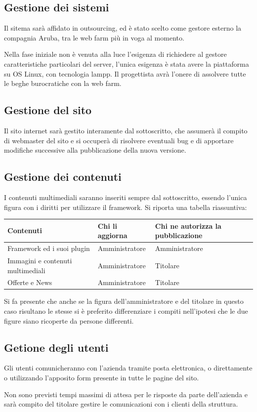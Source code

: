 \documentclass[a4paper,12pt,hidelinks]{report}
\begin{document}
  \subsection{Gestione dei sistemi}
    Il sitema sarà affidato in outsourcing, ed è stato scelto come gestore esterno la compagnia Aruba, tra le web farm più in voga al momento.
    \par Nella fase iniziale non è venuta alla luce l'esigenza di richiedere al gestore caratteristiche particolari del server, l'unica esigenza è stata avere la piattaforma su OS Linux, con tecnologia lampp.
    Il progettista avrà l'onere di assolvere tutte le beghe burocratiche con la web farm.
    
  \subsection{Gestione del sito}
    Il sito internet sarà gestito interamente dal sottoscritto, che assumerà il compito di webmaster del sito e si occuperà di risolvere eventuali bug e 
    di apportare modifiche successive alla pubblicazione della nuova versione.
    
  \subsection{Gestione dei contenuti}
    I contenuti multimediali saranno inseriti sempre dal sottoscritto, essendo l'unica figura con i diritti per utilizzare il framework.
    Si riporta una tabella riassuntiva:
    \begin{center}
      \begin{tabular}{||m{6cm}|m{3cm}|m{3cm}||}
	\hline
	  \textbf{Contenuti} & \textbf{Chi li aggiorna} & \textbf{Chi ne autorizza la pubblicazione}\\
	\hline
	  Framework ed i suoi plugin & Amministratore & Amministratore\\
	\hline
	  Immagini e contenuti multimediali & Amministratore & Titolare\\
	\hline  
	  Offerte e News & Amministratore & Titolare \\
	\hline
      \end{tabular}
    \end{center}
    \par Si fa presente che anche se la figura dell'amministratore e del titolare in questo caso risultano le stesse si è preferito differenziare i compiti nell'ipotesi
    che le due figure siano ricoperte da persone differenti.
  \subsection{Getione degli utenti}
    Gli utenti comunicheranno con l'azienda tramite posta elettronica, o direttamente o utilizzando l'apposito form presente in tutte le pagine del sito.
    \par Non sono previsti tempi massimi di attesa per le risposte da parte dell'azienda e sarà compito del titolare gestire le comunicazioni con i clienti della struttura.
\end{document}
